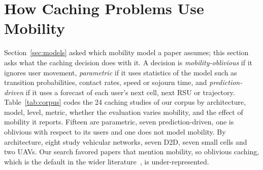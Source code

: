
\section{How Caching Problems Use Mobility}
\label{sec:problems}

Section~\ref{sec:models} asked which mobility model a paper assumes; this section asks what the caching decision does with it. A decision is \emph{mobility-oblivious} if it ignores user movement, \emph{parametric} if it uses statistics of the model such as transition probabilities, contact rates, speed or sojourn time, and \emph{prediction-driven} if it uses a forecast of each user's next cell, next RSU or trajectory.
Table~\ref{tab:corpus} codes the 24 caching studies of our corpus by architecture, model, level, metric, whether the evaluation varies mobility, and the effect of mobility it reports. Fifteen are parametric, seven prediction-driven, one is oblivious with respect to its users and one does not model mobility. By architecture, eight study vehicular networks, seven D2D, seven small cells and two UAVs. Our search favored papers that mention mobility, so oblivious caching, which is the default in the wider literature~\cite{shanmugam2013femtocaching,maddahali2014fundamental}, is under-represented. %

